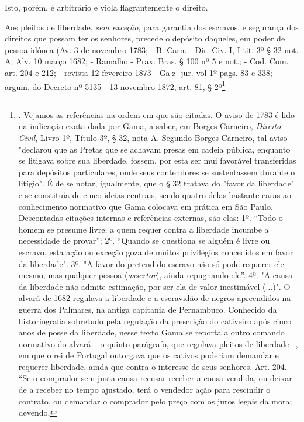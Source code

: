 Isto, porém, é arbitrário e viola flagrantemente o direito.

Aos pleitos de liberdade, \emph{sem exceção}, para garantia dos
escravos, e segurança dos direitos que possam ter os senhores, precede o
depósito daqueles, em poder de pessoa idônea (Av. 3 de novembro 1783; -
B. Carn. - Dir. Civ. I, I tit. 3º § 32 not. A; Alv. 10 março 1682; -
Ramalho - Prax. Bras. § 100 nº 5 e not.; - Cod. Com. art. 204 e 212; -
revista 12 fevereiro 1873 - Ga{[}z{]} jur. vol 1º pags. 83 e 338; -
argum. do Decreto nº 5135 - 13 novembro 1872, art. 81, § 2º\footnote{.
  Vejamos as referências na ordem em que são citadas. O aviso de 1783 é
  lido na indicação exata dada por Gama, a saber, em Borges Carneiro,
  \emph{Direito Civil}, Livro 1º, Título 3º, § 32, nota A. Segundo
  Borges Carneiro, tal aviso "declarou que as Pretas que se achavam
  presas em cadeia pública, enquanto se litigava sobre sua liberdade,
  fossem, por esta ser mui favorável transferidas para depósitos
  particulares, onde seus contendores se sustentassem durante o
  litígio". É de se notar, igualmente, que o § 32 tratava do "favor da
  liberdade" e se constituía de cinco ideias centrais, sendo quatro
  delas bastante caras ao conhecimento normativo que Gama colocava em
  prática em São Paulo. Descontadas citações internas e referências
  externas, são elas: 1º. ``Todo o homem se presume livre; a quem requer
  contra a liberdade incumbe a necessidade de provar''; 2º. ``Quando se
  questiona se alguém é livre ou escravo, esta ação ou exceção goza de
  muitos privilégios concedidos em favor da liberdade". 3º. "A favor do
  pretendido escravo não só pode requerer ele mesmo, mas qualquer pessoa
  (\emph{assertor}), ainda repugnando ele''. 4º. "A causa da liberdade
  não admite estimação, por ser ela de valor inestimável (...)". O
  alvará de 1682 regulava a liberdade e a escravidão de negros
  apreendidos na guerra dos Palmares, na antiga capitania de Pernambuco.
  Conhecido da historiografia sobretudo pela regulação da prescrição do
  cativeiro após cinco anos de posse da liberdade, nesse texto Gama se
  reporta a outro comando normativo do alvará -- o quinto parágrafo, que
  regulava pleitos de liberdade --, em que o rei de Portugal outorgava
  que os cativos poderiam demandar e requerer liberdade, ainda que
  contra o interesse de seus senhores. Art. 204. ``Se o comprador sem
  justa causa recusar receber a cousa vendida, ou deixar de a receber no
  tempo ajustado, terá o vendedor ação para rescindir o contrato, ou
  demandar o comprador pelo preço com os juros legais da mora; devendo,
}
